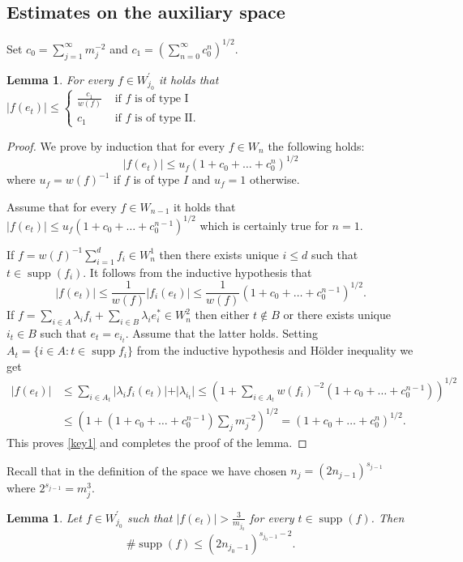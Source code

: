 \documentclass[a4paper]{amsart}
\theoremstyle{plain}
\newtheorem{lemma}[theorem]{Lemma}
\DeclareMathOperator{\supp}{supp}
\begin{document}
\subsection{Estimates on the auxiliary space}\label{subsec}
Set $c_0=\sum_{j=1}^{\infty}m_{j}^{-2}$ and $c_{1}=(\sum_{n=0}^{\infty}c_0^n)^{1/2}$.
\begin{lemma}\label{linfty} For every $f\in W_{j_0}^{\prime}$ it holds that
$\vert f(e_t)\vert\leq\begin{cases}\frac{c_1}{w(f)}\,\,&\text{if $f$ is of type I}\\
c_1 &\text{if $f$ is of type II}.
\end{cases}
$
\end{lemma}
\begin{proof}
 We prove by induction that for every $f\in W_{n}$ the following holds:
\begin{equation}\label{key1}
\vert f(e_t)\vert\leq u_{f}(1+c_0+\dots+c_{0}^n)^{1/2}
\end{equation}
where  $u_{f}=w(f)^{-1}$ if $f$ is of type  $I$ and $u_{f}=1$ otherwise.

Assume that for every  $f\in W_{n-1} $ it holds that $\vert f(e_t)\vert\leq u_{f}(1+c_0+\dots+c_{0}^{n-1})^{1/2}$ which is certainly true for $n=1$.

If $f=w(f)^{-1}\sum_{i=1}^{d}f_{i}\in W_{n}^{1}$ then there
exists unique  $i\leq d$ such that $t\in\supp(f_{i})$. It follows
from  the inductive hypothesis that
$$\vert f(e_t)\vert\leq \frac{1}{w(f)}\vert f_{i}(e_t)\vert\leq \frac{1}{w(f)}(1+c_0+\dots+c_{0}^{n-1})^{1/2}.
$$
If $f=\sum_{i\in A}\lambda_{i}f_{i}+\sum_{i\in
B}\lambda_{i}e^{*}_{i}\in W_{n}^{2}$ then either $t\not\in B$ or
there exists unique $i_{t}\in B$ such that $e_{t}=e_{i_t}$.
Assume that the latter holds. Setting  $A_{t}=\{i\in A: t\in\supp
f_{i}\}$ from the inductive hypothesis and H\"older inequality  we get
\begin{align*}
\vert f(e_t)\vert &\leq \sum_{i\in A_{t}}\vert \lambda_{i}f_{i}(e_t)\vert+\vert \lambda_{i_t}\vert
\leq
 (1+\sum_{i\in A_{t}}w(f_i)^{-2}(1+c_0+\dots+c_{0}^{n-1}))^{1/2}
 \\
 &\leq (1+(1+c_0+\dots+c_{0}^{n-1})\sum_{j}m_{j}^{-2})^{1/2}
 =(1+c_0+\dots+c_{0}^{n})^{1/2}.
\end{align*}
This proves \eqref{key1} and completes the proof  of the lemma.
\end{proof}
Recall that in the definition of the space we have chosen $n_{j}=(2n_{j-1})^{s_{j-1}}$ where $2^{s_{j-1}}=m_{j}^{3}$.
\begin{lemma}\label{linfty2} Let $f\in W_{j_0}^{\prime}$ such that $\vert f(e_{t})\vert>\frac{3}{m_{j_0}}$ for every $t\in\supp(f)$. Then
$$\#\supp(f)\leq (2n_{j_0-1})^{s_{j_0-1}-2}.
$$
 \end{lemma}
\end{document}
